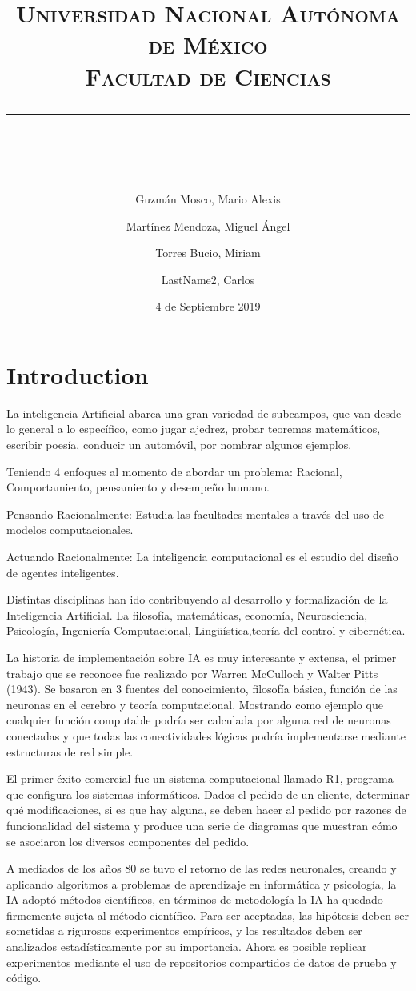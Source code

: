 \documentclass[10pt, a4paper]{article}
\title{\begin{center}
 {\LARGE \scshape Universidad Nacional Aut\'onoma de M\'exico \\ Facultad de Ciencias }
  \rule{1\textwidth}{2.0pt}\\
\end{center}}
\author{
  Guzmán Mosco, Mario Alexis\\
  \and  
  Mart\'inez Mendoza, Miguel \'Angel\\
  \and
  Torres Bucio, Miriam\\
  \and
  LastName2, Carlos\\
}
\date{4 de Septiembre 2019}
\begin{document}
\maketitle

\section{Introduction}

La inteligencia Artificial abarca una gran variedad de subcampos, que van desde lo general a lo específico, como jugar ajedrez, probar teoremas matemáticos, escribir poesía, conducir un automóvil, por nombrar algunos ejemplos.

Teniendo 4 enfoques al momento de abordar un problema: Racional, Comportamiento, pensamiento y desempeño humano.

Pensando Racionalmente: Estudia las facultades mentales a través del uso de modelos computacionales.

Actuando Racionalmente: La inteligencia computacional es el estudio del diseño de agentes inteligentes.

Distintas disciplinas han ido contribuyendo al desarrollo y formalización de la Inteligencia Artificial. La filosofía, matemáticas, economía, Neurosciencia, Psicología, Ingeniería Computacional, Lingüística,teoría del control y cibernética.

La historia de implementación sobre IA es muy interesante y extensa, el primer trabajo que se reconoce fue realizado por Warren McCulloch y Walter Pitts (1943). Se basaron en 3 fuentes del conocimiento, filosofía básica, función de las neuronas en el cerebro y teoría computacional. Mostrando como ejemplo que cualquier función computable podría ser calculada por alguna red de neuronas conectadas y que todas las conectividades lógicas podría implementarse mediante estructuras de red simple.

El primer éxito comercial fue un sistema computacional llamado R1, programa que configura los sistemas informáticos. Dados el pedido de un cliente, determinar qué modificaciones, si es que hay alguna, se deben hacer al pedido por razones de funcionalidad del sistema y produce una serie de diagramas que muestran cómo se asociaron los diversos componentes del pedido. 

A mediados de los años 80 se tuvo el retorno de las redes neuronales, creando y aplicando algoritmos a problemas de aprendizaje en informática y psicología, la IA adoptó métodos científicos, en términos de metodología la IA ha quedado firmemente sujeta al método científico. Para ser aceptadas, las hipótesis deben ser sometidas a rigurosos experimentos empíricos, y los resultados deben ser analizados estadísticamente por su importancia. Ahora es posible replicar experimentos mediante el uso de repositorios compartidos de datos de prueba y código.
\end{document}
